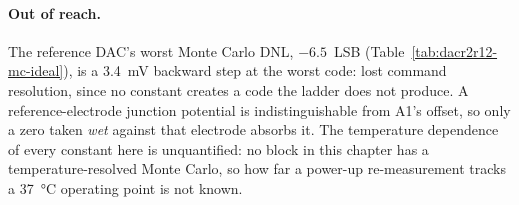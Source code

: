 \paragraph{Out of reach.} The reference DAC's worst Monte Carlo DNL,
\(-6.5\)~LSB (Table~\ref{tab:dacr2r12-mc-ideal}), is a \SI{3.4}{\milli\volt}
backward step at the worst code: lost command resolution, since no constant
creates a code the ladder does not produce. A reference-electrode junction
potential is indistinguishable from A1's offset, so only a zero taken \emph{wet}
against that electrode absorbs it. The temperature dependence of every constant
here is unquantified: no block in this chapter has a temperature-resolved Monte
Carlo, so how far a power-up re-measurement tracks a \SI{37}{\celsius} operating
point is not known.
